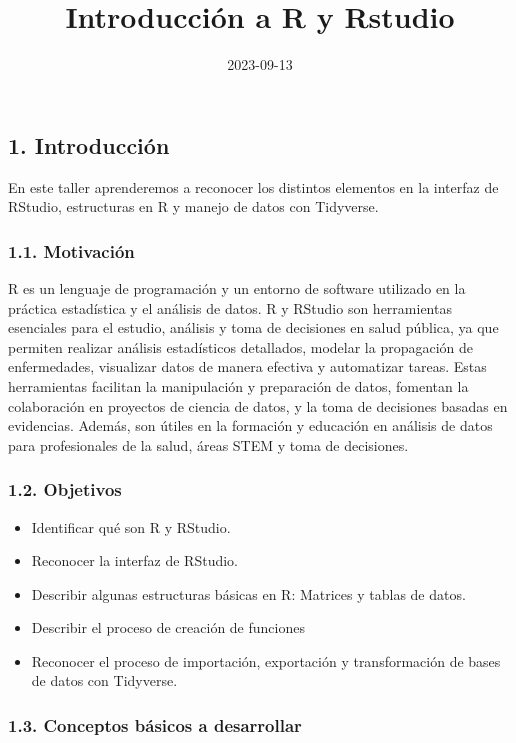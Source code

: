 \documentclass[
]{article}
\title{Introducción a R y Rstudio}
\author{}
\date{\vspace{-2.5em}2023-09-13}
\providecommand{\tightlist}{%
  \setlength{\itemsep}{0pt}\setlength{\parskip}{0pt}}
\begin{document}
\maketitle

\subsection{1. Introducción}\label{introducciuxf3n}

En este taller aprenderemos a reconocer los distintos elementos en la
interfaz de RStudio, estructuras en R y manejo de datos con Tidyverse.

\subsubsection{1.1. Motivación}\label{motivaciuxf3n}

R es un lenguaje de programación y un entorno de software utilizado en
la práctica estadística y el análisis de datos. R y RStudio son
herramientas esenciales para el estudio, análisis y toma de decisiones
en salud pública, ya que permiten realizar análisis estadísticos
detallados, modelar la propagación de enfermedades, visualizar datos de
manera efectiva y automatizar tareas. Estas herramientas facilitan la
manipulación y preparación de datos, fomentan la colaboración en
proyectos de ciencia de datos, y la toma de decisiones basadas en
evidencias. Además, son útiles en la formación y educación en análisis
de datos para profesionales de la salud, áreas STEM y toma de
decisiones.

\subsubsection{1.2. Objetivos}\label{objetivos}

\begin{itemize}
\tightlist
\item
  Identificar qué son R y RStudio.
\item
  Reconocer la interfaz de RStudio.
\item
  Describir algunas estructuras básicas en R: Matrices y tablas de
  datos.
\item
  Describir el proceso de creación de funciones
\item
  Reconocer el proceso de importación, exportación y transformación de
  bases de datos con Tidyverse.
\end{itemize}

\subsubsection{1.3. Conceptos básicos a
desarrollar}\label{conceptos-buxe1sicos-a-desarrollar}
\end{document}
